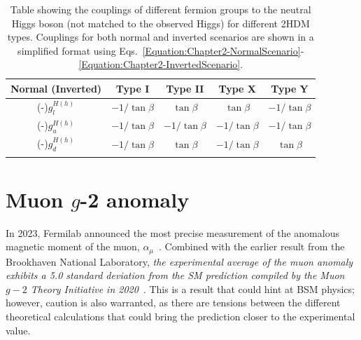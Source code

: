 \begin{table}[!htbp]
\centering
\renewcommand{\arraystretch}{1.5} %
\setlength{\tabcolsep}{12pt} %
\begin{tabular}{|c|c|c|c|c|}
\hline
Normal (Inverted)     & Type I                     & Type II                     & Type X                                        & Type Y                      \\ \hline \hline
(-)$g_l^{H(h)}$ & $-1/\tan{\beta}$  & $\tan{\beta}$  & $\tan{\beta}$                    & $-1/\tan{\beta}$  \\ \arrayrulecolor{lightgray} \hline
(-)$g_u^{H(h)}$ & $-1/\tan{\beta}$  & $-1/\tan{\beta}$  & $-1/\tan{\beta}$                    & $-1/\tan{\beta}$  \\ \arrayrulecolor{lightgray} \hline
(-)$g_d^{H(h)}$ & $-1/\tan{\beta}$  & $\tan{\beta}$  & $-1/\tan{\beta}$                    & $\tan{\beta}$  \\ \arrayrulecolor{black} \hline
\end{tabular}
\caption[Neutral Higgs–fermion couplings for different Two-Higgs Doublet Model types]{Table showing the couplings of different fermion groups to the neutral Higgs boson (not matched to the observed Higgs) for different \ac{2HDM} types. Couplings for both normal and inverted scenarios are shown in a simplified format using Eqs.~\ref{Equation:Chapter2-NormalScenario}-\ref{Equation:Chapter2-InvertedScenario}.}
\label{Table:Chapter2_2HDM-CouplingsAlignmentLimit}
\end{table}

\section{\texorpdfstring{Muon $g$-2 anomaly}{Muon g-2 anomaly}}
\label{Section:Chapter2_gminus2}
In 2023, Fermilab announced the most precise measurement of the anomalous magnetic moment of the muon, $\alpha_\mu$~\cite{Fermilab_g-2}. Combined with the earlier result from the Brookhaven National Laboratory, \textit{the experimental average of the muon anomaly exhibits a 5.0 standard deviation from the \ac{SM} prediction compiled by the Muon $g-2$ Theory Initiative in 2020}~\cite{Muon_Theory_Initiative}. This is a result that could hint at \ac{BSM} physics; however, caution is also warranted, as there are tensions between the different theoretical calculations that could bring the prediction closer to the experimental value.



